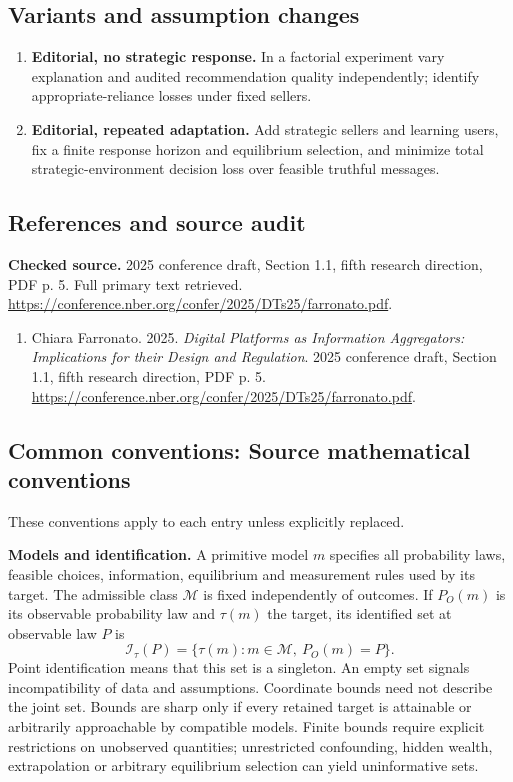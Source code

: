 \documentclass[11pt,a4paper]{article}
\begin{document}
\subsection*{Variants and assumption changes}
\begin{enumerate}
\item \textbf{Editorial, no strategic response.} In a factorial experiment vary explanation and audited recommendation quality independently; identify appropriate-reliance losses under fixed sellers.
\item \textbf{Editorial, repeated adaptation.} Add strategic sellers and learning users, fix a finite response horizon and equilibrium selection, and minimize total strategic-environment decision loss over feasible truthful messages.
\end{enumerate}
\subsection*{References and source audit}
\textbf{Checked source.} 2025 conference draft, Section 1.1, fifth research direction, PDF p. 5. Full primary text retrieved. \url{https://conference.nber.org/confer/2025/DTs25/farronato.pdf}.
\begin{enumerate}\raggedright
\item\hypertarget{definitions:source:30007686:1}{} Chiara Farronato. 2025. \emph{Digital Platforms as Information Aggregators: Implications for their Design and Regulation}. 2025 conference draft, Section 1.1, fifth research direction, PDF p. 5.
\url{https://conference.nber.org/confer/2025/DTs25/farronato.pdf}.
\end{enumerate}

\subsection*{Common conventions: Source mathematical conventions}

These conventions apply to each entry unless explicitly replaced.

\textbf{Models and identification.} A primitive model \(m\) specifies all probability laws, feasible choices, information, equilibrium and measurement rules used by its target. The admissible class \(\mathcal M\) is fixed independently of outcomes. If \(P_O(m)\) is its observable probability law and \(\tau(m)\) the target, its identified set at observable law \(P\) is
\[
 \mathcal I_\tau(P)=\{\tau(m):m\in\mathcal M,\ P_O(m)=P\}.
\]
Point identification means that this set is a singleton. An empty set signals incompatibility of data and assumptions. Coordinate bounds need not describe the joint set. Bounds are sharp only if every retained target is attainable or arbitrarily approachable by compatible models. Finite bounds require explicit restrictions on unobserved quantities; unrestricted confounding, hidden wealth, extrapolation or arbitrary equilibrium selection can yield uninformative sets.
\end{document}
